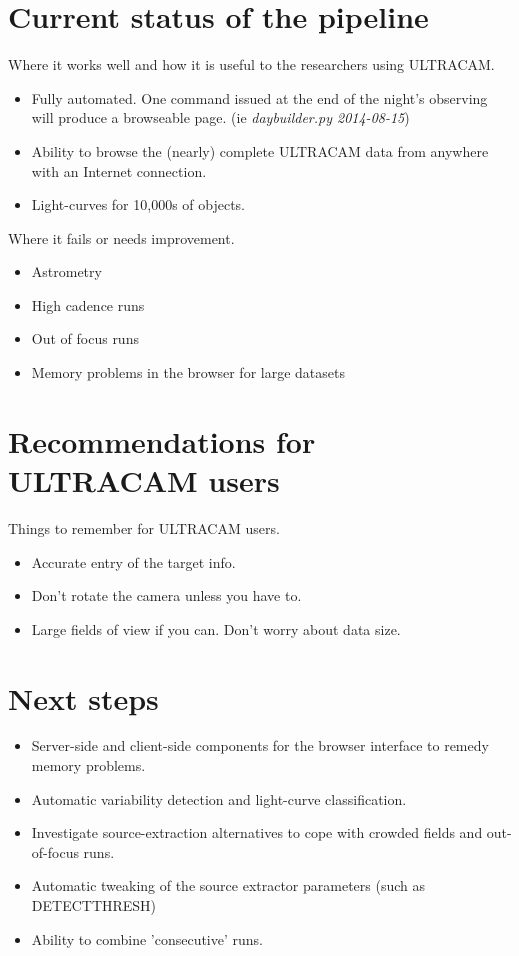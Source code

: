 
\section{Current status of the pipeline}

Where it works well and how it is useful to the researchers using ULTRACAM.
\begin{itemize}
  \item Fully automated. One command issued at the end of the night's observing will produce a browseable page. (ie \emph{daybuilder.py 2014-08-15})
  \item Ability to browse the (nearly) complete ULTRACAM data from anywhere with an Internet connection. 
  \item Light-curves for 10,000s of objects.
\end{itemize}

Where it fails or needs improvement.
\begin{itemize}
  \item Astrometry
  \item High cadence runs
  \item Out of focus runs
  \item Memory problems in the browser for large datasets 
\end{itemize}

\section{Recommendations for ULTRACAM users}

Things to remember for ULTRACAM users. 
\begin{itemize}
	\item Accurate entry of the target info.
	\item Don't rotate the camera unless you have to.
	\item Large fields of view if you can. Don't worry about data size. 
\end{itemize} 

\section{Next steps}
\begin{itemize}
	\item Server-side and client-side components for the browser interface to remedy memory problems.
	\item Automatic variability detection and light-curve classification. 
	\item Investigate source-extraction alternatives to cope with crowded fields and out-of-focus runs.
	\item Automatic tweaking of the source extractor parameters (such as DETECT\textunderscore THRESH)
	\item Ability to combine 'consecutive' runs. 
\end{itemize} 
 

